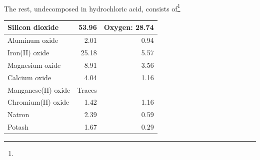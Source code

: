 \documentclass[a4paper, 12pt, oneside]{article}
\begin{document}
\paragraph*{}
The rest, undecomposed in hydrochloric acid, consists of\footnote{}
\begin{center}
    \begin{tabular}{ |l|r|r| } 
    \hline
    Silicon dioxide & 53.96 & Oxygen: 28.74\\\hline
    Aluminum oxide & 2.01 & 0.94\\\hline
    Iron(II) oxide & 25.18 & 5.57\\\hline
    Magnesium oxide & 8.91 & 3.56\\\hline
    Calcium oxide & 4.04 & 1.16\\\hline
    Manganese(II) oxide & Traces &\\\hline
    Chromium(II) oxide & 1.42 & 1.16\\\hline
    Natron & 2.39 & 0.59\\\hline
    Potash & 1.67 & 0.29\\
    \hline
    \end{tabular}
\end{center}
\end{document}
